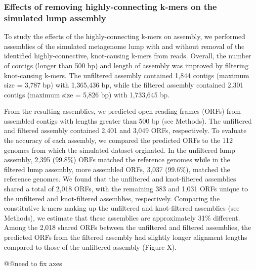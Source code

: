 \documentclass[11pt]{article} %
\begin{document}
\subsubsection{Effects of removing highly-connecting k-mers on the simulated lump assembly}
To study the effects of the highly-connecting k-mers on assembly, we performed assemblies of the simulated metagenome lump with and without removal of the identified highly-connective, knot-causing k-mers from reads.  Overall, the number of contigs (longer than 500 bp) and length of assembly was improved by filtering knot-causing k-mers.  The unfiltered assembly contained 1,844 contigs (maximum size = 3,787 bp) with 1,365,436 bp, while the filtered assembly contained 2,301 contigs (maximum size = 5,826 bp) with 1,733,645 bp.

From the resulting assemblies, we predicted open reading frames (ORFs) from assembled contigs with lengths greater than 500 bp (see Methods).  The unfiltered and filtered assembly contained 2,401 and 3,049 ORFs, respectively.  To evaluate the accuracy of each assembly, we compared the predicted ORFs to the 112 genomes from which the simulated dataset orginated.  In the unfiltered lump assembly, 2,395 (99.8\%) ORFs matched the reference genomes while in the filtered lump assembly, more assembled ORFs, 3,037 (99.6\%), matched the reference genomes.  We found that the unfiltered and knot-filtered assemblies shared a total of 2,018 ORFs, with the remaining 383 and 1,031 ORFs unique to the unfiltered and knot-filtered assemblies, respectively.  Comparing the constitutive k-mers making up the unfiltered and knot-filtered assemblies (see Methods), we estimate that these assemblies are approximately 31\% different.  Among the 2,018 shared ORFs between the unfiltered and filtered assemblies, the predicted ORFs from the filtered assembly had slightly longer alignment lengths compared to those of the unfiltered assembly (Figure X).

@@need to fix axes
\end{document}
